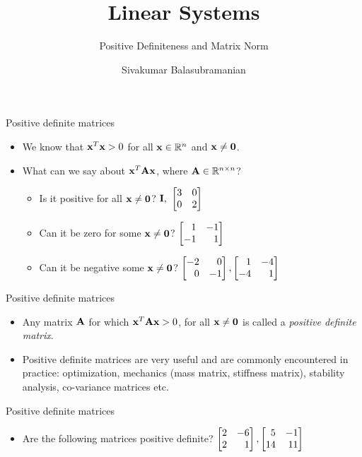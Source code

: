 \documentclass[aspectratio=169]{beamer}
\title{Linear Systems}
\subtitle{Positive Definiteness and Matrix Norm}
\author{Sivakumar Balasubramanian}
\institute[Christian Medical College] %
{
  \inst{}%
  Department of Bioengineering\\
  Christian Medical College, Bagayam\\
  Vellore 632002
}
\date{}
\let\olditem\item
\renewcommand{\item}{\setlength{\itemsep}{\fill}\olditem}
\def\mf{\ensuremath\mathbf}
\def\mb{\ensuremath\mathbb}
\def\bmx{\ensuremath\begin{bmatrix*}[r]}
\def\emx{\ensuremath\end{bmatrix*}}
\begin{document}
\begin{frame}
  \titlepage
\end{frame}

\begin{frame}[t]{Positive definite matrices}
\begin{itemize}
    \item We know that $\mf{x}^T\mf{x} > 0$ for all $\mf{x} \in \mb{R}^n$ and $\mf{x} \neq \mf{0}$.

    \item What can we say about $\mf{x}^T\mf{Ax}$, where $\mf{A} \in \mb{R}^{n \times n}$?
    \begin{itemize}
        \item Is it positive for all $\mf{x} \neq \mf{0}$?
        $\mf{I}, \,\, \bmx3 & 0\\0 & 2\emx$ 
        \item Can it be zero for some $\mf{x} \neq \mf{0}$? 
        $\bmx1 & -1\\-1 & 1\emx$
        \item Can it be negative some $\mf{x} \neq \mf{0}$? 
        $\bmx-2 & 0\\0 & -1\emx, \bmx1 & -4\\-4 & 1\emx$
    \end{itemize}
\end{itemize}
\end{frame}


\begin{frame}[t]{Positive definite matrices}
\begin{itemize}
    \item Any matrix $\mf{A}$ for which $\mf{x}^T\mf{A}\mf{x} > 0$, for all $\mf{x} \neq \mf{0}$ is called a \textit{positive definite matrix}.

    \item Positive definite matrices are very useful and are commonly encountered in practice: optimization, mechanics (mass matrix, stiffness matrix), stability analysis, co-variance matrices etc.
\end{itemize}
\end{frame}


\begin{frame}[t]{Positive definite matrices}
\begin{itemize}
    \item Are the following matrices positive definite? $\bmx 2 & -6\\2 & 1\emx, \bmx 5 & -1\\14 & 11\emx$ 
\end{itemize}
\end{frame}
\end{document}
